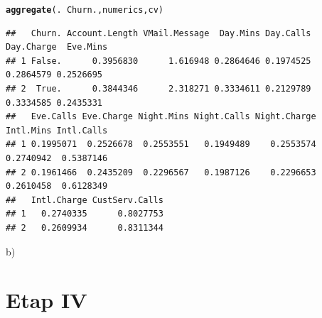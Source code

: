 \documentclass{article}\usepackage[]{graphicx}\usepackage[]{color}
\makeatletter
\newcommand{\hlopt}[1]{\textcolor[rgb]{0,0,0}{#1}}%
\newcommand{\hlstd}[1]{\textcolor[rgb]{0.345,0.345,0.345}{#1}}%
\newcommand{\hlkwd}[1]{\textcolor[rgb]{0.737,0.353,0.396}{\textbf{#1}}}%
\newenvironment{kframe}{%
 \def\at@end@of@kframe{}%
 \ifinner\ifhmode%
  \def\at@end@of@kframe{\end{minipage}}%
  \begin{minipage}{\columnwidth}%
 \fi\fi%
 \def\FrameCommand##1{\hskip\@totalleftmargin \hskip-\fboxsep
 \colorbox{shadecolor}{##1}\hskip-\fboxsep
     \hskip-\linewidth \hskip-\@totalleftmargin \hskip\columnwidth}%
 \MakeFramed {\advance\hsize-\width
   \@totalleftmargin\z@ \linewidth\hsize
   \@setminipage}}%
 {\par\unskip\endMakeFramed%
 \at@end@of@kframe}
\newenvironment{knitrout}{}{} %
\makeatother
\begin{document}
\begin{description}
\begin{knitrout}
\color{fgcolor}\begin{kframe}
\begin{alltt}
\hlkwd{aggregate}\hlstd{(.} \hlopt{~} \hlstd{Churn., numerics, cv)}
\end{alltt}
\begin{verbatim}
##   Churn. Account.Length VMail.Message  Day.Mins Day.Calls Day.Charge  Eve.Mins
## 1 False.      0.3956830      1.616948 0.2864646 0.1974525  0.2864579 0.2526695
## 2  True.      0.3844346      2.318271 0.3334611 0.2129789  0.3334585 0.2435331
##   Eve.Calls Eve.Charge Night.Mins Night.Calls Night.Charge Intl.Mins Intl.Calls
## 1 0.1995071  0.2526678  0.2553551   0.1949489    0.2553574 0.2740942  0.5387146
## 2 0.1961466  0.2435209  0.2296567   0.1987126    0.2296653 0.2610458  0.6128349
##   Intl.Charge CustServ.Calls
## 1   0.2740335      0.8027753
## 2   0.2609934      0.8311344
\end{verbatim}
\end{kframe}
\end{knitrout}

\item{b)}

\end{description}

\section{Etap IV}
\end{document}
